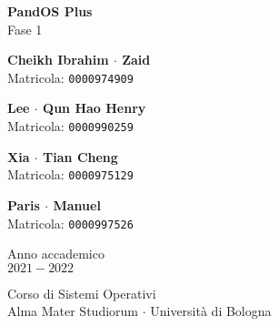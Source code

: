 \documentclass[11pt]{article}
\begin{document}
\graphicspath{ {./img/} }
\begin{titlepage}
    \begin{center}
        \vspace*{1.5cm}
            
        \Huge
        \textbf{PandOS Plus} \\
        \LARGE
        Fase 1
                        
        \vspace{2.0cm}
          
        \begin{minipage}[t]{0.47\textwidth}
        \begin{center}
        	{\large{\bf Cheikh Ibrahim $\cdot$ Zaid}}\\
			{\large Matricola: \texttt{0000974909}}
        \end{center}

		\end{minipage}
		\hfill
		\begin{minipage}[t]{0.47\textwidth}\raggedleft
		\begin{center}
        	{\large{\bf Lee $\cdot$ Qun Hao Henry}}\\
			{\large Matricola: \texttt{0000990259}}
        \end{center}
		\end{minipage}

        \vspace{1cm}

        \begin{minipage}[t]{0.47\textwidth}
            \begin{center}
                {\large{\bf Xia $\cdot$ Tian Cheng}}\\
                {\large Matricola: \texttt{0000975129}}
            \end{center}
    
            \end{minipage}
            \hfill
            \begin{minipage}[t]{0.47\textwidth}\raggedleft
            \begin{center}
                {\large{\bf Paris $\cdot$ Manuel}}\\
                {\large Matricola: \texttt{0000997526}}
            \end{center}
            \end{minipage}  
            
        \vspace{6cm}
            
        Anno accademico\\
        $2021 - 2022$
            
        \vspace{0.8cm}
            
            
        \Large
        Corso di Sistemi Operativi\\
        Alma Mater Studiorum $\cdot$ Università di Bologna\\
            
    \end{center}
\end{titlepage}
\pagebreak
\end{document}
